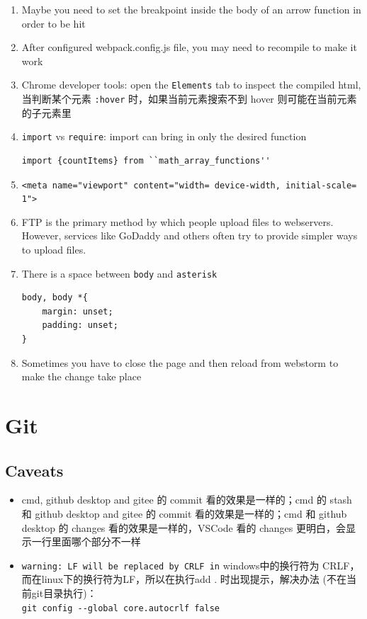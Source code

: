 \documentclass[a4paper, 12pt]{article}
\begin{document}
\begin{enumerate}
\item Maybe you need to set the breakpoint inside the body of an arrow function in order to be hit

\item After configured webpack.config.js file, you may need to recompile to make it work

\item Chrome developer tools: open the \verb|Elements| tab to inspect the compiled html, 当判断某个元素 \verb|:hover| 时，如果当前元素搜索不到 hover 则可能在当前元素的子元素里

\item \verb|import| vs \verb|require|: import can bring in only the desired function
\begin{verbatim}
import {countItems} from ``math_array_functions''
\end{verbatim}

\item \verb|<meta name="viewport" content="width= device-width, initial-scale= 1">|

\item  FTP is the primary method by which people upload files to webservers. However, services like GoDaddy and others often try to provide simpler ways to upload files.

\item There is a space between \verb|body| and \verb|asterisk|
\begin{verbatim}
body, body *{
    margin: unset;
    padding: unset;
}
\end{verbatim}

\item Sometimes you have to close the page and then reload from webstorm to make the change take place
\end{enumerate}


\section{Git}

\subsection{Caveats}
\begin{itemize}

\item cmd, github desktop and gitee 的 commit 看的效果是一样的；cmd 的 stash 和 github desktop and gitee 的 commit 看的效果是一样的；cmd 和 github desktop 的 changes 看的效果是一样的，VSCode 看的 changes 更明白，会显示一行里面哪个部分不一样

\item \verb|warning: LF will be replaced by CRLF in| windows中的换行符为 CRLF， 而在linux下的换行符为LF，所以在执行add . 时出现提示，解决办法 (不在当前git目录执行)：\\
\verb|git config --global core.autocrlf false|
\end{itemize}
\end{document}
